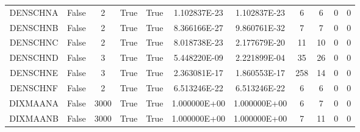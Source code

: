 \begin{longtable}{ccccccccccc}
	\cellcolor{default1} DENSCHNA& \cellcolor{default1} False& \cellcolor{default1} 2& \cellcolor{default1} True& \cellcolor{default1} True& \cellcolor{ok} 1.102837E-23& \cellcolor{best} 1.102837E-23& \cellcolor{best} 6& \cellcolor{best} 6& \cellcolor{default1} 0& \cellcolor{default1} 0\\
	\cellcolor{default2} DENSCHNB& \cellcolor{default2} False& \cellcolor{default2} 2& \cellcolor{default2} True& \cellcolor{default2} True& \cellcolor{ok} 8.366166E-27& \cellcolor{best} 9.860761E-32& \cellcolor{best} 7& \cellcolor{best} 7& \cellcolor{default2} 0& \cellcolor{default2} 0\\
	\cellcolor{default1} DENSCHNC& \cellcolor{default1} False& \cellcolor{default1} 2& \cellcolor{default1} True& \cellcolor{default1} True& \cellcolor{best} 8.018738E-23& \cellcolor{ok} 2.177679E-20& \cellcolor{ok} 11& \cellcolor{best} 10& \cellcolor{default1} 0& \cellcolor{default1} 0\\
	\cellcolor{default2} DENSCHND& \cellcolor{default2} False& \cellcolor{default2} 3& \cellcolor{default2} True& \cellcolor{default2} True& \cellcolor{best} 5.448220E-09& \cellcolor{poor} 2.221899E-04& \cellcolor{ok} 35& \cellcolor{best} 26& \cellcolor{default2} 0& \cellcolor{default2} 0\\
	\cellcolor{default1} DENSCHNE& \cellcolor{default1} False& \cellcolor{default1} 3& \cellcolor{default1} True& \cellcolor{default1} True& \cellcolor{ok} 2.363081E-17& \cellcolor{best} 1.860553E-17& \cellcolor{poor} 258& \cellcolor{best} 14& \cellcolor{default1} 0& \cellcolor{default1} 0\\
	\cellcolor{default2} DENSCHNF& \cellcolor{default2} False& \cellcolor{default2} 2& \cellcolor{default2} True& \cellcolor{default2} True& \cellcolor{ok} 6.513246E-22& \cellcolor{best} 6.513246E-22& \cellcolor{best} 6& \cellcolor{best} 6& \cellcolor{default2} 0& \cellcolor{default2} 0\\
	\cellcolor{default1} DIXMAANA& \cellcolor{default1} False& \cellcolor{default1} 3000& \cellcolor{default1} True& \cellcolor{default1} True& \cellcolor{best} 1.000000E+00& \cellcolor{best} 1.000000E+00& \cellcolor{best} 6& \cellcolor{ok} 7& \cellcolor{default1} 0& \cellcolor{default1} 0\\
	\cellcolor{default2} DIXMAANB& \cellcolor{default2} False& \cellcolor{default2} 3000& \cellcolor{default2} True& \cellcolor{default2} True& \cellcolor{best} 1.000000E+00& \cellcolor{best} 1.000000E+00& \cellcolor{best} 7& \cellcolor{ok} 11& \cellcolor{default2} 0& \cellcolor{default2} 0\\

\end{longtable}
